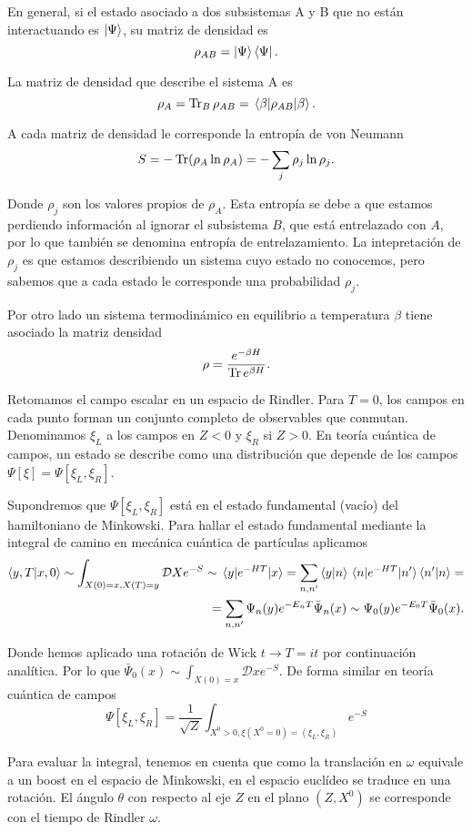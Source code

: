 En general, si el estado asociado a dos subsistemas A y B que no están interactuando 
es $\ket{\Psi}$, su matriz de densidad es
\begin{equation}
  \rho_{AB}=\ket{\Psi}\bra{\Psi}.
\end{equation}

La matriz de densidad que describe el sistema A es
\begin{equation}
  \rho_{A}=\Tr_B \rho_{AB}=\expval{\rho_{AB}}{\beta}.
\end{equation}
 
A cada matriz de densidad le corresponde la entropía de von Neumann
\begin{equation}
  S=-\Tr (\rho_A \ln \rho_A)=-\sum_j \rho_j \ln \rho_j.
\end{equation}

Donde $\rho_j$ son los valores propios de $\rho_A$.
Esta entropía se debe a que estamos perdiendo información al ignorar el subsistema $B$, que 
está entrelazado con $A$, por lo que también se denomina entropía de entrelazamiento.
La intepretación de $\rho_j$ es que estamos describiendo un sistema cuyo estado no 
conocemos, pero sabemos que a cada estado le corresponde una probabilidad $\rho_j$.

Por otro lado un sistema termodinámico en equilibrio a temperatura $\beta$ tiene 
asociado la matriz densidad 
\begin{equation}
  \rho=\frac{e^{-\beta H}}{\Tr e^{\beta H}}.
\end{equation}

Retomamos el campo escalar en un espacio de Rindler. 
Para $T=0$, los campos en cada punto forman un conjunto completo de observables que 
conmutan. Denominamos $\xi_L$ a los campos en $Z<0$ y $\xi_R$ si $Z>0$.
En teoría cuántica de campos, un estado se describe como una distribución que 
depende de los campos $\Psi[\xi]=\Psi[\xi_L,\xi_R]$.

Supondremos que $\Psi[\xi_L,\xi_R]$ está en el estado fundamental (vacío) del hamiltoniano
de Minkowski. Para hallar el estado fundamental mediante la integral de camino 
en mecánica cuántica de partículas aplicamos
\begin{align}
  \braket{y,T}{x,0}\sim \int_{X(0)=x,X(T)=y} \mathcal D X e^{-S} \sim 
  \mel{y}{e^{-HT}}{x}=\sum_{n,n'} \ip{y}{n}\mel{n}{e^{-HT}}{n'}\ip{n'}{n}=\\
  =\sum_{n,n'} \Psi_n(y) e^{-E_n T} \bar{\Psi}_n(x)\sim   \Psi_0(y) e^{-E_0 T} \bar{\Psi}_0(x).
\end{align}

Donde hemos aplicado una rotación de Wick $t\to T=it$ por continuación analítica.
Por lo que $\bar{\Psi}_0(x)\sim \int_{X(0)=x} \mathcal D x e^{-S}$.
De forma similar en teoría cuántica de campos 
\begin{equation}
  \Psi[\xi_L,\xi_R]=\frac{1}{\sqrt{Z}}\int_{X^0>0, \xi(X^0=0)=(\xi_L,\xi_R)} e^{-S}
\end{equation}

Para evaluar la integral, tenemos en cuenta que como la translación en $\omega$
equivale a un boost en el espacio de Minkowski, en el espacio euclídeo se traduce
en una rotación.
El ángulo $\theta$ con respecto al eje $Z$ en el plano $(Z,X^0)$ se corresponde con
el tiempo de Rindler $\omega$.
